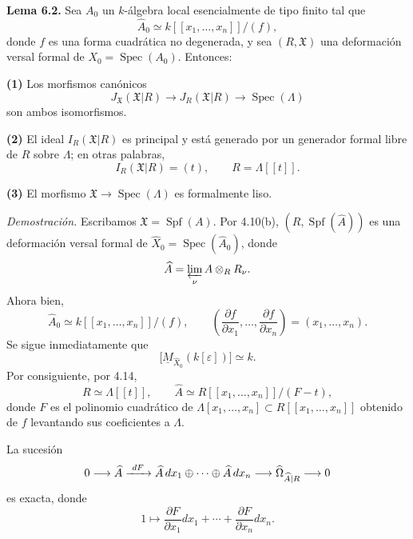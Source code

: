 \par\medskip
\noindent\textbf{Lema 6.2.}
Sea $A_0$ un $k$-álgebra local esencialmente de tipo finito tal que
\[
\widehat A_0\simeq k[[x_1,\ldots,x_n]]/(f),
\]
donde $f$ es una forma cuadrática no degenerada, y sea
$(R,\mathfrak X)$ una deformación versal formal de
$X_0=\operatorname{Spec}(A_0)$. Entonces:

\smallskip
\noindent\textbf{(1)} Los morfismos canónicos
\[
J_{\mathfrak X}(\mathfrak X|R)
 \longrightarrow J_R(\mathfrak X|R)
 \longrightarrow \operatorname{Spec}(\Lambda)
\]
son ambos isomorfismos.

\smallskip
\noindent\textbf{(2)} El ideal
$I_R(\mathfrak X|R)$ es principal y está generado por un generador
formal libre de $R$ sobre $\Lambda$; en otras palabras,
\[
I_R(\mathfrak X|R)=(t),
\qquad R=\Lambda[[t]].
\]

\smallskip
\noindent\textbf{(3)} El morfismo
$\mathfrak X\longrightarrow\operatorname{Spec}(\Lambda)$ es
formalmente liso.

\smallskip
\noindent\textit{Demostración.}
Escribamos $\mathfrak X=\operatorname{Spf}(A)$. Por 4.10(b),
$(R,\operatorname{Spf}(\widehat A))$ es una deformación versal formal
de $\widehat X_0=\operatorname{Spec}(\widehat A_0)$, donde
\[
\widehat A=\varprojlim_\nu A\otimes_RR_\nu.
\]
Ahora bien,
\[
\widehat A_0\simeq k[[x_1,\ldots,x_n]]/(f),
\qquad
\left(\frac{\partial f}{\partial x_1},\ldots,
      \frac{\partial f}{\partial x_n}\right)
=(x_1,\ldots,x_n).
\]
Se sigue inmediatamente que
\[
\bigl[\underline M_{\widehat X_0}(k[\varepsilon])\bigr]
\simeq k.
\]
Por consiguiente, por 4.14,
\[
R\simeq\Lambda[[t]],
\qquad
\widehat A\simeq R[[x_1,\ldots,x_n]]/(F-t),
\]
donde $F$ es el polinomio cuadrático de
$\Lambda[x_1,\ldots,x_n]\subset R[[x_1,\ldots,x_n]]$ obtenido de
$f$ levantando sus coeficientes a $\Lambda$.

La sucesión
\[
0\longrightarrow\widehat A
 \sisi{\overset{dF}{\relbar\joinrel\relbar\joinrel\relbar}}{\xrightarrow{\ dF\ }}
 \widehat A\,dx_1\oplus\cdots\oplus\widehat A\,dx_n
 \sisi{\relbar\joinrel\relbar\joinrel\relbar\joinrel\relbar\joinrel\relbar}{\longrightarrow}\widehat\Omega_{\widehat A|R}\longrightarrow0
\]
es exacta, donde
\[
1\longmapsto
 \frac{\partial F}{\partial x_1}dx_1+\cdots+
 \frac{\partial F}{\partial x_n}dx_n.
\]


